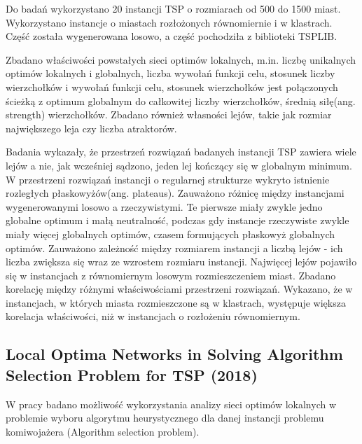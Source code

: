 Do badań wykorzystano 20 instancji TSP o rozmiarach od 500 do 1500 miast.
Wykorzystano instancje o miastach rozłożonych równomiernie i w klastrach.
Część została wygenerowana losowo, a część pochodziła z biblioteki TSPLIB.

Zbadano właściwości powstałych sieci optimów lokalnych, m.in. liczbę unikalnych optimów lokalnych i globalnych, liczba wywołań funkcji celu,
stosunek liczby wierzchołków i wywołań funkcji celu, stosunek wierzchołków jest połączonych ścieżką
z optimum globalnym do całkowitej liczby wierzchołków, średnią siłę(ang. strength) wierzchołków.
Zbadano również własności lejów, takie jak rozmiar największego leja czy liczba atraktorów.

Badania wykazały, że przestrzeń rozwiązań badanych instancji TSP zawiera wiele lejów a nie, jak wcześniej sądzono,
jeden lej kończący się w globalnym minimum. W przestrzeni rozwiązań instancji o regularnej strukturze
wykryto istnienie rozległych płaskowyżów(ang. plateaus). Zauważono różnicę między instancjami wygenerowanymi losowo a rzeczywistymi.
Te pierwsze miały zwykle jedno globalne optimum i małą neutralność, podczas gdy instancje rzeczywiste
zwykle miały więcej globalnych optimów, czasem formujących płaskowyż globalnych optimów.
Zauważono zależność między rozmiarem instancji a liczbą lejów - ich liczba zwiększa się wraz ze wzrostem
rozmiaru instancji. Najwięcej lejów pojawiło się w instancjach z równomiernym losowym rozmieszczeniem miast.
Zbadano korelację między różnymi właściwościami przestrzeni rozwiązań.
Wykazano, że w instancjach, w których miasta rozmieszczone są w klastrach, występuje większa korelacja
właściwości, niż w instancjach o rozłożeniu równomiernym.

\subsection*{Local Optima Networks in Solving Algorithm Selection Problem for TSP (2018) \cite{DBLP:conf/depcos/BozejkoGNAB18}}
W pracy badano możliwość wykorzystania analizy sieci optimów lokalnych w problemie wyboru algorytmu heurystycznego dla danej instancji problemu komiwojażera
(Algorithm selection problem).

